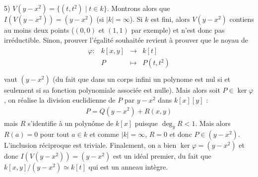         \begin{question}{5)}
            $V(y - x^2) = \{(t,t^2) \mid t \in k\}$. Montrons alors que $I(V(y -x^2)) = (y - x^2)$ (si $|k| = \infty$). Si $k$ est fini, alors $V(y - x^2)$ contiens au moins deux points ($(0,0)$ et $(1,1)$ par exemple) et n'est donc pas irréductible. Sinon, prouver l'égalité souhaitée revient à prouver que le noyau de
            \begin{align*}
                \begin{array}{cccc}
                    \varphi : & k[x,y] & \to & k[t] \\
                    & P & \mapsto & P(t,t^2) \\
                \end{array}
            \end{align*}
            vaut $(y - x^2)$ (du fait que dans un corps infini un polynome est nul si et seulement si sa fonction polynomiale associée est nulle). Mais alors soit $P \in \ker \varphi$, on réalise la division euclidienne de $P$ par $y - x^2$ dans $k[x][y]$ :
            \begin{align*}
                P = Q(y - x^2) + R(x,y)
            \end{align*}
            mais $R$ s'identifie à un polynôme de $k[x]$ puisque $\deg_y R < 1$. Mais alors $R(a) = 0$ pour tout $a \in k$ et comme $|k| = \infty$, $R = 0$ et donc $P \in (y - x^2)$. L'inclusion réciproque est triviale. Finalement, on a bien $\ker \varphi = (y - x^2)$ et donc $I(V(y - x^2)) = (y - x^2)$ est un idéal premier, du fait que $k[x,y]/(y - x^2) \simeq k[t]$ qui est un anneau intègre.
        \end{question}
